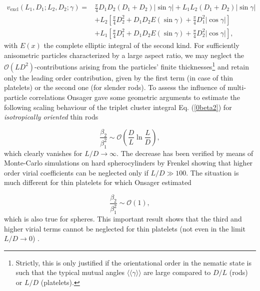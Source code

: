 {\begin{align}
v_{\text{excl}}(L_{1},D_{1};L_{2},D_{2};\gamma)=& \frac{\pi}{4}D_{1}D_{2}(D_{1}+D_{2})\left|\sin\gamma\right| +L_{1}L_{2}(D_{1}+D_{2})
\left|\sin\gamma\right| \nonumber  \\
&+L_{2}\left[\frac{\pi}{4}D_{2}^{2}+D_{1}D_{2}E(\sin\gamma)+\frac{\pi}{4}D_{1}^{2} \left|\cos\gamma \right| \right] \nonumber \\
&+L_{1}\left[\frac{\pi}{4}D_{1}^{2}+D_{1}D_{2}E(\sin\gamma)+\frac{\pi}{4}D_{2}^{2} \left|\cos\gamma \right| \right],
\label{0evonsager}
\end{align}
with $E(x)$ the complete elliptic integral of the second kind. For sufficiently anisometric particles characterized by a  large aspect ratio, we may neglect the $\mathcal{O}(LD^{2})$-contributions arising from the particles' finite thicknesses\footnote{Strictly,
this is only justified if the orientational order in the nematic state is such that the  typical mutual angles $ \langle\langle\gamma \rangle\rangle $ are large compared
to $D/L$ (rods) or $L/D$ (platelets).} and  retain only the leading order contribution, given by the first term (in case of thin platelets) or the second one (for slender rods). To assess the influence of  multi-particle correlations Onsager gave some geometric arguments to estimate the following scaling behaviour of the triplet cluster integral Eq. (\ref{0beta2}) for {\em isotropically oriented} thin rods

\begin{equation}
\frac{\beta_{2}}{\beta_{1}^{2}}\sim \mathcal{O}\left(\frac{D}{L}\ln\frac{L}{D}\right),
\end{equation}
which clearly vanishes for $L/D \rightarrow \infty $. The decrease  has been  verified by means of Monte-Carlo simulations on hard spherocylinders by Frenkel \cite{Frenkel87,Frenkel87err} showing that higher order virial coefficients can be neglected only if $L/D\gg 100$. The situation is much different for thin platelets for which Onsager estimated

\begin{equation}
\frac{\beta_{2}}{\beta_{1}^{2}}\sim \mathcal{O}(1), \label{0clusterplate}
\end{equation}
which is also true for spheres. This important result shows that the third and higher virial terms cannot be neglected for thin platelets (not even in the limit $L/D\rightarrow 0$) \cite{Veerman}.

}
